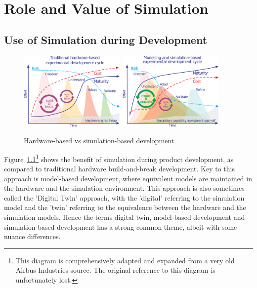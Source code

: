 \chapter{Role and Value of Simulation}

\section{Use of Simulation during Development}
\label{sec:UseofSimulationinDevelopment}

\begin{figure}[tph]
\includegraphics[width=0.46\textwidth]{pic/scesysinvest01}\hfill
\includegraphics[width=0.46\textwidth]{pic/scesysinvest02}
\caption{Hardware-based vs simulation-based development  \label{fig:scesysinvest01}}
\end{figure}

Figure~\ref{fig:scesysinvest01}\footnote{This diagram is comprehensively adapted and expanded from a very old Airbus Industries source.  The original reference to this diagram is unfortunately lost.} shows the benefit of simulation during product development, as compared to traditional hardware build-and-break development. Key to this approach is model-based development, where equivalent models are maintained in the hardware and the simulation environment.  This approach is also sometimes called the 'Digital Twin' approach, with the 'digital' referring to the simulation model and the 'twin' referring to the equivalence between the hardware and the simulation models. Hence the terms digital twin, model-based development and simulation-based development has a strong common theme, albeit with some nuance differences.

